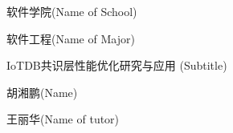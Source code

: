 
\school
{软件学院}{(Name of School)}

\major
{软件工程}{(Name of Major)}

\thesistitle
{IoTDB共识层性能优化研究与应用}
{}
{(Subtitle)}

\thesisauthor
{胡湘鹏}{(Name)}

\teacher
{王丽华}{(Name of tutor)}






